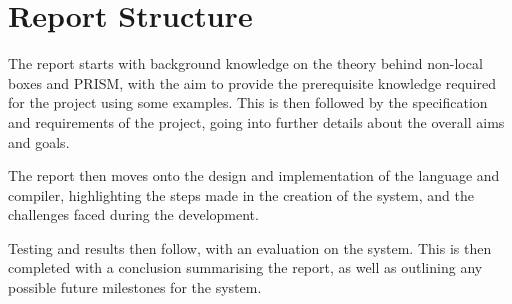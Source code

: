 \documentclass[report.tex]{subfiles}
\begin{document}
\section{Report Structure} %
\label{sec:report_structure}
The report starts with background knowledge on the theory behind non-local boxes
and PRISM, with the aim to provide the prerequisite knowledge required for the
project using some examples. This is then followed by the specification and
requirements of the project, going into further details about the overall
aims and goals.

The report then moves onto the design and implementation of the language and
compiler, highlighting the steps made in the creation of the system, and the
challenges faced during the development.

Testing and results then follow, with an evaluation on the system. This is then
completed with a conclusion summarising the report, as well as outlining any
possible future milestones for the system.
\newpage
\end{document}
